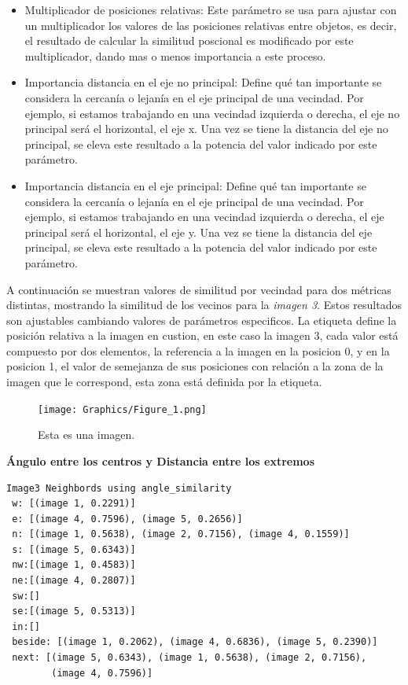 \begin{itemize}
    \item Multiplicador de posiciones relativas: Este parámetro se usa para ajustar con un multiplicador los valores de las posiciones relativas entre objetos, es decir, el resultado de calcular la similitud poscional es modificado por este multiplicador, dando mas o menos importancia a este proceso. 

    \item Importancia distancia en el eje no principal: Define qué tan importante se considera la cercanía o lejanía en el eje principal de una vecindad. Por ejemplo, si estamos trabajando en una vecindad izquierda o derecha, el eje no principal será el horizontal, el eje x. Una vez se tiene la distancia del eje no principal, se eleva este resultado a la potencia del valor indicado por este par\'ametro.

    \item Importancia distancia en el eje principal: Define qué tan importante se considera la cercanía o lejanía en el eje principal de una vecindad. Por ejemplo, si estamos trabajando en una vecindad izquierda o derecha, el eje principal será el horizontal, el eje y. Una vez se tiene la distancia del eje principal, se eleva este resultado a la potencia del valor indicado por este par\'ametro.
\end{itemize}

A continuación se muestran valores de similitud por vecindad para dos métricas distintas, mostrando la similitud de los vecinos para la \textit{imagen 3}. Estos resultados son ajustables cambiando valores de parámetros especificos. La etiqueta define la posición relativa a la imagen en custion, en este caso la imagen 3, cada valor está compuesto por dos elementos, la referencia a la imagen en la posicion 0, y en la posicion 1, el valor de semejanza de sus posiciones con relación a la zona de la imagen que le correspond, esta zona est\'a definida por la etiqueta.

\begin{figure}[h]
\centering
\texttt{[image: Graphics/Figure\_1.png]}
\caption{Esta es una imagen.}
\label{fig:my_label}
\end{figure}

\noindent\textbf{\'Angulo entre los centros y Distancia entre los extremos}
\begin{verbatim}
Image3 Neighbords using angle_similarity
 w: [(image 1, 0.2291)]
 e: [(image 4, 0.7596), (image 5, 0.2656)]
 n: [(image 1, 0.5638), (image 2, 0.7156), (image 4, 0.1559)]
 s: [(image 5, 0.6343)]
 nw:[(image 1, 0.4583)]
 ne:[(image 4, 0.2807)]
 sw:[]
 se:[(image 5, 0.5313)]
 in:[]
 beside: [(image 1, 0.2062), (image 4, 0.6836), (image 5, 0.2390)]
 next: [(image 5, 0.6343), (image 1, 0.5638), (image 2, 0.7156), 
        (image 4, 0.7596)]
\end{verbatim}

